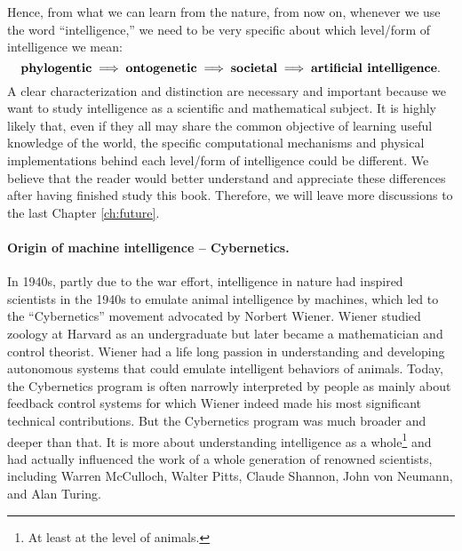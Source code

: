 \documentclass[\toplevelprefix/book-main.tex]{subfiles}
\begin{document}
Hence, from what we can learn from the nature, from now on, whenever we use the word ``intelligence,'' we need to be very specific about which level/form of intelligence we mean:
\begin{equation}
\mbox{\textbf{phylogentic}} \;
   \Longrightarrow \; \mbox{\textbf{ontogenetic}} \; \Longrightarrow \; 
   \mbox{\textbf{societal}}
   \; \Longrightarrow \; 
   \mbox{\textbf{artificial intelligence}}.
\end{equation}
A clear characterization and distinction are necessary and important because we want to study intelligence as a scientific and mathematical subject. It is highly likely that, even if they all may share the common objective of learning useful knowledge of the world, the specific computational mechanisms and physical implementations behind each level/form of intelligence could be different. We believe that the reader would better understand and appreciate these differences after having finished study this book. Therefore, we will leave more discussions to the last Chapter \ref{ch:future}.





\paragraph{Origin of machine intelligence -- Cybernetics.}
In 1940s, partly due to the war effort, intelligence in nature had inspired scientists in the 1940s to emulate animal intelligence by machines, which led to the ``Cybernetics''  movement advocated by Norbert Wiener. Wiener studied zoology at Harvard as an undergraduate but later became a mathematician and control theorist. Wiener had a life long passion in understanding and developing autonomous systems that could emulate intelligent behaviors of animals. Today, the Cybernetics program is often narrowly interpreted by people as mainly about feedback control systems for which Wiener indeed made his most significant technical contributions. But the Cybernetics program was much broader and deeper than that. It is more about understanding intelligence as a whole\footnote{At least at the level of animals.} and had actually influenced the work of a whole generation of renowned scientists, including Warren McCulloch, Walter Pitts, Claude Shannon, John von Neumann, and Alan Turing.  
\end{document}
